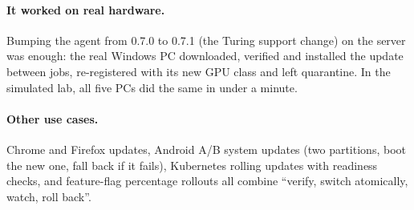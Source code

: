 \paragraph{It worked on real hardware.} Bumping the agent from 0.7.0 to 0.7.1
(the Turing support change) on the server was enough: the real Windows PC
downloaded, verified and installed the update between jobs, re-registered with
its new GPU class and left quarantine. In the simulated lab, all five PCs did
the same in under a minute.

\paragraph{Other use cases.} Chrome and Firefox updates, Android A/B system
updates (two partitions, boot the new one, fall back if it fails), Kubernetes
rolling updates with readiness checks, and feature-flag percentage rollouts
all combine ``verify, switch atomically, watch, roll back''.
